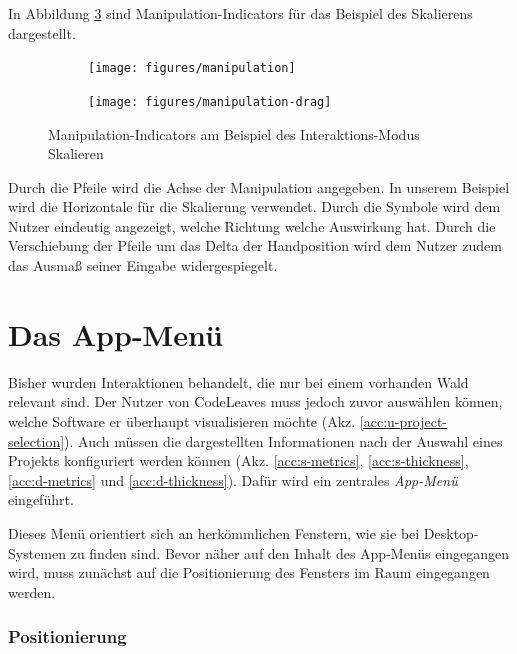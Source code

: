 In Abbildung \ref{fig:manipulation} sind Manipulation-Indicators für das Beispiel des Skalierens dargestellt.

\begin{figure}[htb]
  \centering
  \begin{subfigure}[t]{\fwidth}
    \centering
    \texttt{[image: figures/manipulation]}
     \label{fig:manipulation}
  \end{subfigure}
  \begin{subfigure}[t]{\fwidth}
    \centering
  	\texttt{[image: figures/manipulation-drag]}
  	 \label{fig:manipulation-drag}
  \end{subfigure}
  \caption{Manipulation-Indicators am Beispiel des Interaktions-Modus Skalieren} \label{fig:manipulation}
\end{figure}

Durch die Pfeile wird die Achse der Manipulation angegeben. In unserem Beispiel wird die Horizontale für die Skalierung verwendet. Durch die Symbole wird dem Nutzer eindeutig angezeigt, welche Richtung welche Auswirkung hat. Durch die Verschiebung der Pfeile um das Delta der Handposition wird dem Nutzer zudem das Ausmaß seiner Eingabe widergespiegelt.

\section{Das App-Menü}
\label{sec:app-menu}

Bisher wurden Interaktionen behandelt, die nur bei einem vorhanden Wald relevant sind. Der Nutzer von CodeLeaves muss jedoch zuvor auswählen können, welche Software er überhaupt visualisieren möchte (Akz. \ref{acc:u-project-selection}). Auch müssen die dargestellten Informationen nach der Auswahl eines Projekts konfiguriert werden können (Akz. \ref{acc:s-metrics}, \ref{acc:s-thickness}, \ref{acc:d-metrics} und \ref{acc:d-thickness}). Dafür wird ein zentrales \textit{App-Menü} eingeführt.

Dieses Menü orientiert sich an herkömmlichen Fenstern, wie sie bei Desktop-Systemen zu finden sind. Bevor näher auf den Inhalt des App-Menüs eingegangen wird, muss zunächst auf die Positionierung des Fensters im Raum eingegangen werden.

\subsubsection*{Positionierung}

